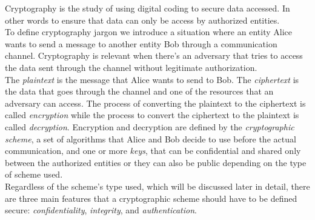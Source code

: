 Cryptography is the study of using digital coding to secure data accessed. In other words to ensure that data can only be access by authorized entities.\\
To define cryptography jargon we introduce a situation where an entity Alice wants to send a message to another entity Bob through a communication channel. Cryptography is relevant when there's an adversary that tries to access the data sent through the channel without legitimate authorization.\\
The \emph{plaintext} is the message that Alice wants to send to Bob. The \emph{ciphertext} is the data that goes through the channel and one of the resources that an adversary can access.
The process of converting the plaintext to the ciphertext is called \emph{encryption} while the process to convert the ciphertext to the plaintext is called \emph{decryption}.
Encryption and decryption are defined by the \emph{cryptographic scheme}, a set of algorithms that Alice and Bob decide to use before the actual communication, and one or more \emph{keys}, that can be confidential and shared only between the authorized entities or they can also be public depending on the type of scheme used.\\
Regardless of the scheme's type used, which will be discussed later in detail, there are three main features that a cryptographic scheme should have to be defined secure: \emph{confidentiality}, \emph{integrity}, and \emph{authentication}.
